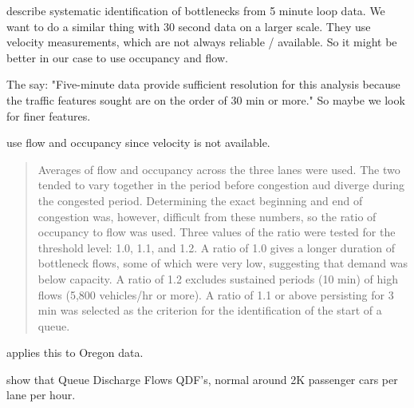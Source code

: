 \documentclass[12pt]{article}
\begin{document}
\cite{chen2004systematic} describe systematic identification of bottlenecks from 5
minute loop data. We want to do a similar thing with 30 second data on a larger scale.
They use velocity measurements, which are not always reliable / available. So it might be 
better in our case to use occupancy and flow.

The say: "Five-minute data provide sufficient
resolution for this analysis because the traffic features sought are on
the order of 30 min or more." So maybe we look for finer features.

\cite{hall1991freeway} use flow and occupancy since velocity is not available.

\begin{quote}
Averages of flow and occupancy across the three lanes were
used. The two tended to vary together in the period before
congestion aud diverge during the congested period. Determining
the exact beginning and end of congestion was,
however, difficult from these numbers, so the ratio of occupancy
to flow was used. Three values of the ratio were tested
for the threshold level: 1.0, 1.1, and 1.2. A ratio of 1.0 gives
a longer duration of bottleneck flows, some of which were
very low, suggesting that demand was below capacity. A ratio
of 1.2 excludes sustained periods (10 min) of high flows (5,800
vehicles/hr or more). A ratio of 1.1 or above persisting for 3
min was selected as the criterion for the identification of the
start of a queue. 
\end{quote}

\cite{wieczorek2010techniques} applies this to Oregon data.

\cite{zhang2004some} show that Queue Discharge Flows QDF's, normal around 2K
passenger cars per lane per hour.

 


\end{document}
